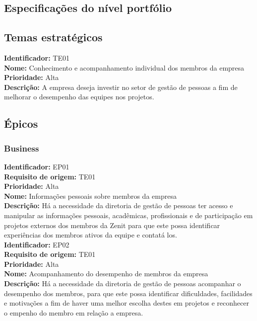 \begin{anexosenv}

\partanexos

\chapter{Especificações do nível portfólio}\label{backlogPortfolio}

\section[Temas Estratégicos]{Temas estratégicos}

\indent \textbf{Identificador:} TE01\\
\indent \textbf{Nome:} Conhecimento e acompanhamento individual dos membros da empresa\\
\indent \textbf{Prioridade:} Alta\\
\indent \textbf{Descrição:} A empresa deseja investir no setor de gestão de pessoas a fim de melhorar o desempenho das equipes nos projetos.\\

\section[Épicos]{Épicos}

\subsection[Business]{Business}

\indent \textbf{Identificador:} EP01\\
\indent \textbf{Requisito de origem:} TE01\\
\indent \textbf{Prioridade:} Alta\\
\indent \textbf{Nome:} Informações pessoais sobre membros da empresa\\
\indent \textbf{Descrição:} Há a necessidade da diretoria de gestão de pessoas ter acesso e manipular as informações pessoais, acadêmicas, profissionais e de participação em projetos externos dos membros da Zenit para que este possa identificar experiências dos membros ativos da equipe e contatá los.\\

\indent \textbf{Identificador:} EP02\\
\indent \textbf{Requisito de origem:} TE01\\
\indent \textbf{Prioridade:} Alta\\
\indent \textbf{Nome:}  Acompanhamento do desempenho de membros da empresa\\
\indent \textbf{Descrição:} Há a necessidade da diretoria de gestão de pessoas acompanhar o desempenho dos membros, para que este possa identificar dificuldades, facilidades e motivações a fim de haver uma melhor escolha destes em projetos e reconhecer o empenho do membro em relação a empresa.\\


\end{anexosenv}
